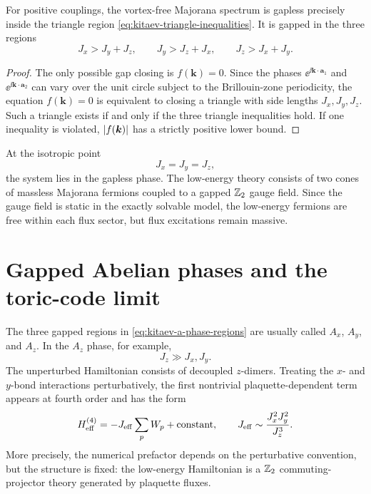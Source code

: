 \begin{proposition}
For positive couplings, the vortex-free Majorana spectrum is gapless precisely
inside the triangle region \cref{eq:kitaev-triangle-inequalities}.  It is gapped
in the three regions
\begin{equation}
\label{eq:kitaev-a-phase-regions}
    J_x>J_y+J_z,
    \qquad
    J_y>J_z+J_x,
    \qquad
    J_z>J_x+J_y .
\end{equation}
\end{proposition}

\begin{proof}
The only possible gap closing is \(f(\bm k)=0\).  Since the phases
\(\ee^{\ii \bm k\cdot\bm a_1}\) and
\(\ee^{\ii \bm k\cdot\bm a_2}\) can vary over the unit circle subject to the
Brillouin-zone periodicity, the equation \(f(\bm k)=0\) is equivalent to closing
a triangle with side lengths \(J_x,J_y,J_z\).  Such a triangle exists if and
only if the three triangle inequalities hold.  If one inequality is violated,
\(\left|f(\bm k)\right|\) has a strictly positive lower bound.
\end{proof}

At the isotropic point
\begin{equation}
\label{eq:kitaev-isotropic-point}
    J_x=J_y=J_z,
\end{equation}
the system lies in the gapless phase.  The low-energy theory consists of two
cones of massless Majorana fermions coupled to a gapped \(\mathbb{Z}_2\) gauge field.
Since the gauge field is static in the exactly solvable model, the low-energy
fermions are free within each flux sector, but flux excitations remain massive.

\section{Gapped Abelian phases and the toric-code limit}
\label{sec:kitaev-abelian-phases-toric-code-limit}

The three gapped regions in \cref{eq:kitaev-a-phase-regions} are usually called
\(A_x\), \(A_y\), and \(A_z\).  In the \(A_z\) phase, for example,
\begin{equation}
\label{eq:kitaev-az-limit-condition}
    J_z\gg J_x,J_y .
\end{equation}
The unperturbed Hamiltonian consists of decoupled \(z\)-dimers.  Treating the
\(x\)- and \(y\)-bond interactions perturbatively, the first nontrivial
plaquette-dependent term appears at fourth order and has the form
\begin{equation}
\label{eq:kitaev-effective-toric-code}
    H_{\rm eff}^{(4)}
    =
    -J_{\rm eff}\sum_p W_p+\text{constant},
    \qquad
    J_{\rm eff}\sim \frac{J_x^2J_y^2}{J_z^3} .
\end{equation}
More precisely, the numerical prefactor depends on the perturbative convention,
but the structure is fixed: the low-energy Hamiltonian is a \(\mathbb{Z}_2\)
commuting-projector theory generated by plaquette fluxes.

